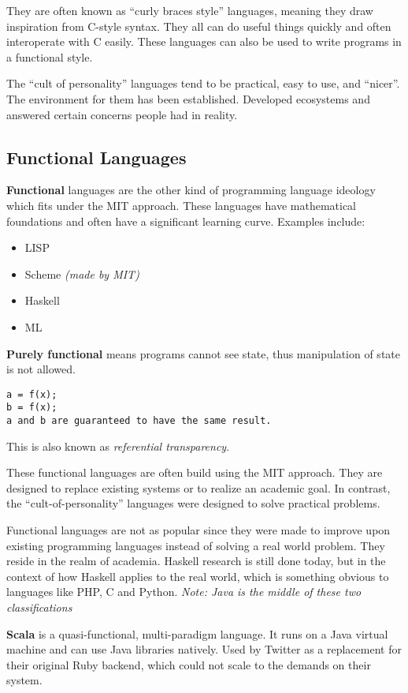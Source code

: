 \documentclass[twoside]{article}
\begin{document}
They are often known as ``curly braces style'' languages, meaning they draw
inspiration from C-style syntax. They all can do useful things quickly and often
interoperate with C easily. These languages can also be used to write programs
in a functional style.

The ``cult of personality'' languages tend to be practical, easy to use, and
``nicer''. The environment for them has been established. Developed ecosystems
and answered certain concerns people had in reality.

\subsection{Functional Languages}
\textbf{Functional} languages are the other kind of programming language
ideology which fits under the MIT approach. These languages have mathematical
foundations and often have a significant learning curve. Examples include:

\begin{itemize}
  \item LISP
  \item Scheme \emph{(made by MIT)}
  \item Haskell
  \item ML
\end{itemize}

\textbf{Purely functional} means programs cannot see state, thus manipulation of
state is not allowed.

\begin{verbatim}
a = f(x);
b = f(x);
a and b are guaranteed to have the same result.
\end{verbatim}
This is also known as \emph{referential transparency}.

These functional languages are often build using the MIT approach. They are
designed to replace existing systems or to realize an academic goal. In
contrast, the ``cult-of-personality'' languages were designed to solve practical
problems.

Functional languages are not as popular since they were made to improve upon
existing programming languages  instead of solving a real world problem. They
reside in the realm of academia. Haskell research is still done today, but in
the context of how Haskell applies to the real world, which is something obvious
to languages like PHP, C and Python. \emph{Note: Java is the middle of these two
classifications}


\textbf{Scala} is a quasi-functional, multi-paradigm language. It runs on a Java
virtual machine and can use Java libraries natively. Used by Twitter as a
replacement for their original Ruby backend, which could not scale to the
demands on their system.
\end{document}
